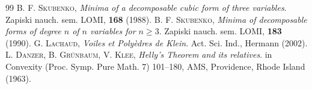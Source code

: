 \documentclass[11pt]{article}
\theoremstyle{definition}
\theoremstyle{remark}
\theoremstyle{plain}
\renewcommand{\geq}{\geqslant}
\begin{document}
\begin{thebibliography}{99}
     \textsc{B. F. Skubenko},
        \textit{Minima of a decomposable cubic form of three variables}.
        Zapiski nauch. sem. LOMI, {\bf 168} (1988).
     \textsc{B. F. Skubenko},
        \textit{Minima of decomposable forms of degree $n$ of $n$ variables for $n\geq 3$}.
        Zapiski nauch. sem. LOMI, {\bf 183} (1990).
     \textsc{G. Lachaud},
        \textit{Voiles et Poly\`{e}dres de Klein}.
        Act. Sci. Ind., Hermann (2002).
     \textsc{L. Danzer, B. Gr\"unbaum, V. Klee},
        \textit{Helly's Theorem and its relatives}.
        in Convexity (Proc. Symp. Pure Math. 7) 101--180,
        AMS, Providence, Rhode Island (1963).
  \end{thebibliography}
\end{document}
